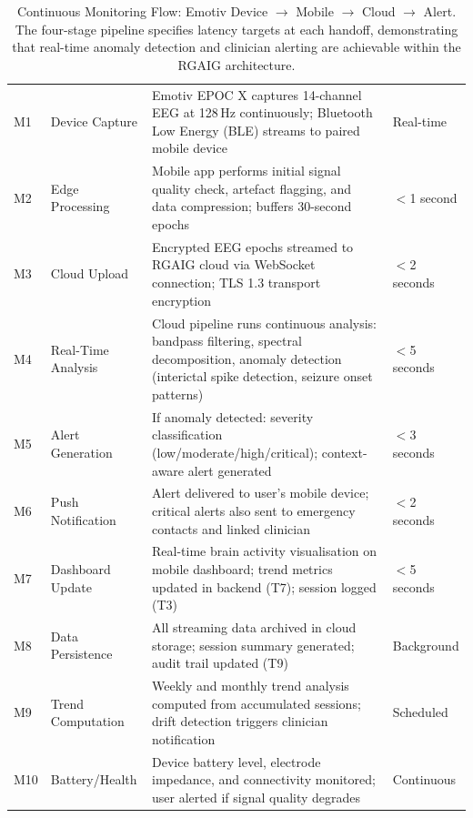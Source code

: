 {\tablestripes\tablefontsize

\begin{xltabular}{\textwidth}{@{} >{\raggedright\arraybackslash}p{1.0cm} >{\raggedright\arraybackslash}p{3.2cm} p{8.5cm} >{\raggedright\arraybackslash}p{1.5cm} @{}}
\caption[Continuous Monitoring Flow: Emotiv Device $$ Mobile $$]{Continuous Monitoring Flow: Emotiv Device $\to$ Mobile $\to$ Cloud $\to$ Alert. The four-stage pipeline specifies latency targets at each handoff, demonstrating that real-time anomaly detection and clinician alerting are achievable within the RGAIG architecture.}\label{tab:continuous_monitoring} \\
\toprule
\thead{\#} &  &  &  \\
\midrule
\endfirsthead
\endhead
\bottomrule
\endlastfoot
M1 & Device Capture & Emotiv EPOC X captures 14-channel EEG at 128\,Hz continuously; Bluetooth Low Energy (BLE) streams to paired mobile device & Real-time \\
\addlinespace
M2 & Edge Processing & Mobile app performs initial signal quality check, artefact flagging, and data compression; buffers 30-second epochs & $<$1 second \\
\addlinespace
M3 & Cloud Upload & Encrypted EEG epochs streamed to RGAIG cloud via WebSocket connection; TLS 1.3 transport encryption & $<$2 seconds \\
\addlinespace
M4 & Real-Time Analysis & Cloud pipeline runs continuous analysis: bandpass filtering, spectral decomposition, anomaly detection (interictal spike detection, seizure onset patterns) & $<$5 seconds \\
\addlinespace
M5 & Alert Generation & If anomaly detected: severity classification (low/moderate/high/critical); context-aware alert generated & $<$3 seconds \\
\addlinespace
M6 & Push Notification & Alert delivered to user's mobile device; critical alerts also sent to emergency contacts and linked clinician & $<$2 seconds \\
\addlinespace
M7 & Dashboard Update & Real-time brain activity visualisation on mobile dashboard; trend metrics updated in backend (T7); session logged (T3) & $<$5 seconds \\
\addlinespace
M8 & Data Persistence & All streaming data archived in cloud storage; session summary generated; audit trail updated (T9) & Background \\
\addlinespace
M9 & Trend Computation & Weekly and monthly trend analysis computed from accumulated sessions; drift detection triggers clinician notification & Scheduled \\
\addlinespace
M10 & Battery/Health & Device battery level, electrode impedance, and connectivity monitored; user alerted if signal quality degrades & Continuous \\
\end{xltabular}}
